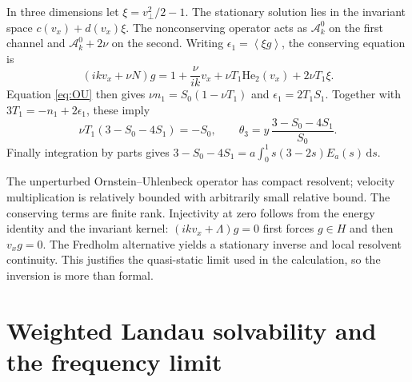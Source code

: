\documentclass[11pt]{article}
\newcommand{\dd}{\,\mathrm d}
\newcommand{\av}[1]{\left\langle #1\right\rangle}
\newcommand{\A}{\mathcal A}
\newcommand{\He}{\mathrm{He}}
\theoremstyle{definition}
\theoremstyle{remark}
\numberwithin{equation}{section}
\begin{document}
In three dimensions let $\xi=v_\perp^2/2-1$. The stationary
solution lies in the invariant space $c(v_x)+d(v_x)\xi$.
The nonconserving operator acts as $\A_k^0$ on the first channel
and $\A_k^0+2\nu$ on the second. Writing
$\epsilon_1=\av{\xi g}$, the conserving equation is
\[
 (ikv_x+\nu N)g
 =1+\frac{\nu}{ik}v_x+\nu T_1\He_2(v_x)+2\nu T_1\xi .
\]
Equation \eqref{eq:OU} then gives
$\nu n_1=S_0(1-\nu T_1)$ and $\epsilon_1=2T_1S_1$.
Together with $3T_1=-n_1+2\epsilon_1$, these imply
\[
 \nu T_1(3-S_0-4S_1)=-S_0,\qquad
 \theta_3=y\,\frac{3-S_0-4S_1}{S_0}.
\]
Finally integration by parts gives
$3-S_0-4S_1=a\int_0^1s(3-2s)E_a(s)\dd s$.

The unperturbed Ornstein--Uhlenbeck operator has compact resolvent;
velocity multiplication is relatively bounded with arbitrarily small
relative bound. The conserving terms are finite rank. Injectivity at
zero follows from the energy identity and the invariant kernel:
$(ikv_x+\Lambda)g=0$ first forces $g\in H$ and then $v_xg=0$.
The Fredholm alternative yields a stationary inverse and local
resolvent continuity. This justifies the quasi-static limit used in
the calculation, so the inversion is more than formal.

\section{Weighted Landau solvability and the frequency limit}\label{app:weighted}
\end{document}

